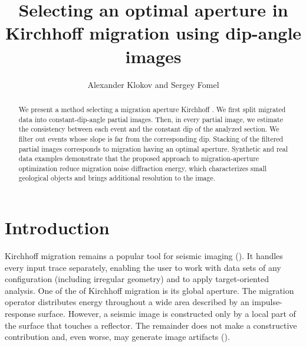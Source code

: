 \title{Selecting an optimal aperture in Kirchhoff migration using dip-angle images}

\renewcommand{\thefootnote}{\fnsymbol{footnote}} 


\author{Alexander Klokov and Sergey Fomel}

\address {
\footnotemark[1]Bureau of Economic Geology, 
Jackson School of Geosciences, 
The University of Texas at Austin, 
University Station, Box X, 
Austin, TX 78713-8924, 
USA 
}

\maketitle

\begin{abstract}
We present a method  selecting a migration aperture  Kirchhoff .
We first split migrated data into constant-dip-angle partial images. Then,
in every partial image, we estimate the consistency between each event and the constant dip of the analyzed
section. We filter out events whose slope is far from the corresponding dip. Stacking of the filtered
partial images corresponds to migration having an optimal aperture. Synthetic and real data examples
demonstrate that the proposed approach to migration-aperture optimization  reduce migration noise 
 diffraction energy, which characterizes small geological objects and brings additional resolution to the image. 
\end{abstract}

\section{Introduction}
Kirchhoff migration remains a popular tool for seismic imaging (\citealp[]{leveille11}).
It handles every input trace separately, enabling the user to work with data sets of any configuration (including
irregular geometry) and to apply target-oriented analysis. One of the  of Kirchhoff migration 
is its global aperture. The migration operator distributes energy throughout a wide area described by 
an impulse-response surface. However, a seismic image is constructed only by a local part of the surface that
touches a reflector. The remainder does not make a constructive contribution and, even worse, may generate
image artifacts (\citealp[]{sun98,hertweck03}).

